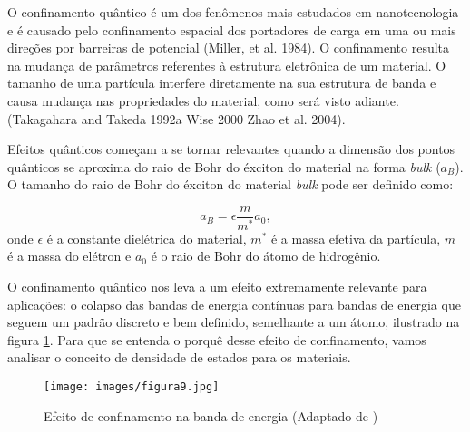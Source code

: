 \par O confinamento quântico é um  dos fenômenos mais estudados em nanotecnologia e é causado pelo confinamento espacial dos portadores de carga em uma ou mais direções por barreiras de potencial (Miller, et al. 1984). O confinamento resulta na mudança de parâmetros referentes à estrutura eletrônica de um material. O tamanho de uma partícula interfere diretamente na sua estrutura de banda e causa mudança nas propriedades do material, como será visto adiante. (Takagahara and Takeda  1992a Wise  2000 Zhao  et  al.  2004).

\par Efeitos quânticos começam a se tornar relevantes quando a dimensão dos pontos quânticos se aproxima do raio de Bohr do éxciton do material na forma \textit{bulk} ($a_{B}$). O tamanho do raio de Bohr do éxciton do material \textit{bulk} pode ser definido\cite{confinamento1} como:

\begin{equation}
	\label{confinamento_1}
	a_{B} = \epsilon \frac{m}{m^{\ast}}a_{0},
\end{equation}
onde $\epsilon$ é a constante dielétrica do material, $m^{\ast}$ é a massa efetiva da partícula, $m$ é a massa do elétron e $a_{0}$ é o raio de Bohr do átomo de hidrogênio.
 
\par O confinamento quântico nos leva a um efeito extremamente relevante para aplicações: o colapso das bandas de energia contínuas para bandas de energia que seguem um padrão discreto e bem definido, semelhante a um átomo, ilustrado na figura \ref{fig9}. Para que se entenda o porquê desse efeito de confinamento, vamos analisar o conceito de densidade de estados para os materiais.

\begin{figure}[H]
  \caption{Efeito de confinamento na banda de energia (Adaptado de \cite{bulk2})}
  \centering
  \texttt{[image: images/figura9.jpg]}
  \label{fig9}
\end{figure}